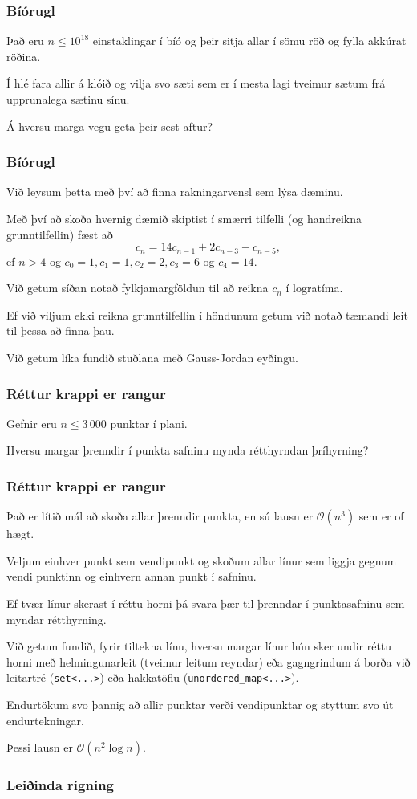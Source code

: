 {
	\frametitle{Bíórugl}
	{
		\item<1-> Það eru $n \leq 10^{18}$ einstaklingar í bíó og þeir sitja allar í sömu röð og fylla akkúrat röðina.
		\item<2-> Í hlé fara allir á klóið og vilja svo sæti sem er í mesta lagi tveimur sætum frá upprunalega sætinu sínu.
		\item<3-> Á hversu marga vegu geta þeir sest aftur?
	}
}

{
	\frametitle{Bíórugl}
	{
		\item<1-> Við leysum þetta með því að finna rakningarvensl sem lýsa dæminu.
		\item<2-> Með því að skoða hvernig dæmið skiptist í smærri tilfelli (og handreikna grunntilfellin) fæst að
		\[
			c_n = 14c_{n - 1} + 2c_{n - 3} - c_{n - 5},
		\]
		ef $n > 4$ og $c_0 = 1, c_1 = 1, c_2 = 2, c_3 = 6$ og $c_4 = 14$.
		\item<3-> Við getum síðan notað fylkjamargföldun til að reikna $c_n$ í logratíma.
		\item<4-> Ef við viljum ekki reikna grunntilfellin í höndunum getum við notað tæmandi leit til þessa að finna þau.
		\item<5-> Við getum líka fundið stuðlana með Gauss-Jordan eyðingu.
	}
}

{
	\frametitle{Réttur krappi er rangur}
	{
		\item<1-> Gefnir eru $n \leq 3\, 000$ punktar í plani.
		\item<2-> Hversu margar þrenndir í punkta safninu mynda rétthyrndan þríhyrning?
	}
}

{
	\frametitle{Réttur krappi er rangur}
	{
		\item<1-> Það er lítið mál að skoða allar þrenndir punkta, en sú lausn er $\mathcal{O}(n^3)$ sem er of hægt.
		\item<2-> Veljum einhver punkt sem vendipunkt og skoðum allar línur sem liggja gegnum vendi punktinn og einhvern annan punkt í safninu.
		\item<3-> Ef tvær línur skerast í réttu horni þá svara þær til þrenndar í punktasafninu sem myndar rétthyrning.
		\item<4-> Við getum fundið, fyrir tiltekna línu, hversu margar línur hún sker undir réttu horni með helmingunarleit (tveimur leitum reyndar)
					eða gagngrindum á borða við leitartré (\texttt{set<...>}) eða hakkatöflu (\texttt{unordered\_map<...>}).
		\item<5-> Endurtökum svo þannig að allir punktar verði vendipunktar og styttum svo út endurtekningar.
		\item<6-> Þessi lausn er $\mathcal{O}(n^2 \log n)$.
	}
}

{
	\frametitle{Leiðinda rigning}
	{
		\item<1-> 
	}
}

{
}


